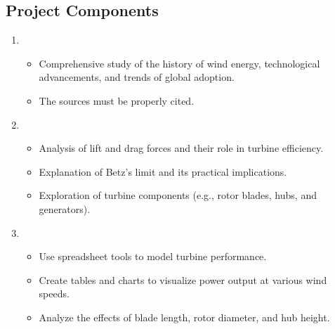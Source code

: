 \documentclass[letterpaper,10pt,english]{jupyterBook}
\begin{document}
\subsection{Project Components}
\label{\detokenize{ProjectInstructions:project-components}}\begin{enumerate}
%
\item {} 
\sphinxAtStartPar
{}
\begin{itemize}
\item {} 
\sphinxAtStartPar
Comprehensive study of the history of wind energy, technological
advancements, and trends of global adoption.

\item {} 
\sphinxAtStartPar
The sources must be properly cited.

\end{itemize}

\item {} 
\sphinxAtStartPar
{}
\begin{itemize}
\item {} 
\sphinxAtStartPar
Analysis of lift and drag forces and their role in turbine
efficiency.

\item {} 
\sphinxAtStartPar
Explanation of Betz’s limit and its practical implications.

\item {} 
\sphinxAtStartPar
Exploration of turbine components (e.g., rotor blades, hubs, and
generators).

\end{itemize}

\item {} 
\sphinxAtStartPar
{}
\begin{itemize}
\item {} 
\sphinxAtStartPar
Use spreadsheet tools to model turbine performance.

\item {} 
\sphinxAtStartPar
Create tables and charts to visualize power output at various
wind speeds.

\item {} 
\sphinxAtStartPar
Analyze the effects of blade length, rotor diameter, and hub
height.

\end{itemize}


\end{enumerate}
\end{document}
